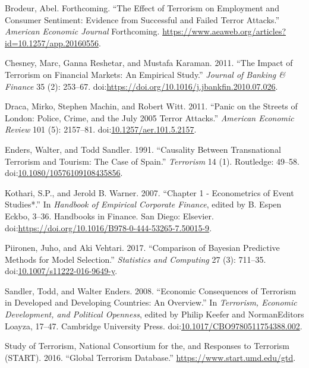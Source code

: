 \documentclass[]{AEA}
\begin{document}
\hypertarget{ref-B_forthcoming}{}
Brodeur, Abel. Forthcoming. ``The Effect of Terrorism on Employment and
Consumer Sentiment: Evidence from Successful and Failed Terror
Attacks.'' \emph{American Economic Journal} Forthcoming.
\url{https://www.aeaweb.org/articles?id=10.1257/app.20160556}.

\hypertarget{ref-CHESNEY2011253}{}
Chesney, Marc, Ganna Reshetar, and Mustafa Karaman. 2011. ``The Impact
of Terrorism on Financial Markets: An Empirical Study.'' \emph{Journal
of Banking \& Finance} 35 (2): 253--67.
doi:\href{https://doi.org/https://doi.org/10.1016/j.jbankfin.2010.07.026}{https://doi.org/10.1016/j.jbankfin.2010.07.026}.

\hypertarget{ref-10.1257ux2faer.101.5.2157}{}
Draca, Mirko, Stephen Machin, and Robert Witt. 2011. ``Panic on the
Streets of London: Police, Crime, and the July 2005 Terror Attacks.''
\emph{American Economic Review} 101 (5): 2157--81.
doi:\href{https://doi.org/10.1257/aer.101.5.2157}{10.1257/aer.101.5.2157}.

\hypertarget{ref-doi:10.1080ux2f10576109108435856}{}
Enders, Walter, and Todd Sandler. 1991. ``Causality Between
Transnational Terrorism and Tourism: The Case of Spain.''
\emph{Terrorism} 14 (1). Routledge: 49--58.
doi:\href{https://doi.org/10.1080/10576109108435856}{10.1080/10576109108435856}.

\hypertarget{ref-Kothari20073}{}
Kothari, S.P., and Jerold B. Warner. 2007. ``Chapter 1 - Econometrics of
Event Studies*.'' In \emph{Handbook of Empirical Corporate Finance},
edited by B. Espen Eckbo, 3--36. Handbooks in Finance. San Diego:
Elsevier.
doi:\href{https://doi.org/https://doi.org/10.1016/B978-0-444-53265-7.50015-9}{https://doi.org/10.1016/B978-0-444-53265-7.50015-9}.

\hypertarget{ref-Piironen2017}{}
Piironen, Juho, and Aki Vehtari. 2017. ``Comparison of Bayesian
Predictive Methods for Model Selection.'' \emph{Statistics and
Computing} 27 (3): 711--35.
doi:\href{https://doi.org/10.1007/s11222-016-9649-y}{10.1007/s11222-016-9649-y}.

\hypertarget{ref-sandler_enders_2008}{}
Sandler, Todd, and Walter Enders. 2008. ``Economic Consequences of
Terrorism in Developed and Developing Countries: An Overview.'' In
\emph{Terrorism, Economic Development, and Political Openness}, edited
by Philip Keefer and NormanEditors Loayza, 17--47. Cambridge University
Press.
doi:\href{https://doi.org/10.1017/CBO9780511754388.002}{10.1017/CBO9780511754388.002}.

\hypertarget{ref-GTD}{}
Study of Terrorism, National Consortium for the, and Responses to
Terrorism (START). 2016. ``Global Terrorism Database.''
\url{https://www.start.umd.edu/gtd}.
\end{document}
